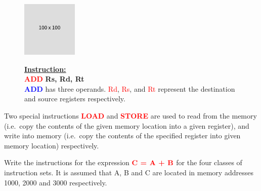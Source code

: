 \documentclass[
  14pt,
  a4paper,
  DIV=11,
  numbers=noendperiod,
  headinclude=true,
  footinclude=true]{scrreprt}
\begin{document}
\begin{figure}[H]

\begin{minipage}{0.40\linewidth}

\includegraphics{index_files/mediabag/FiKGhYhhIWJYiBgWIoaF.png}\end{minipage}%
%
\begin{minipage}{0.60\linewidth}

\begin{tcolorbox}[colback=boxbodycol, colframe=boxbodycol]
\textbf{\underline{Instruction:}}\\
\textcolor{red}{\textbf{ADD}} \textbf{Rs, Rd, Rt}\\
\textcolor{blue}{\textbf{ADD}} has three operands. \textcolor{red}{Rd},
\textcolor{red}{Rs}, and \textcolor{red}{Rt} represent the destination
and source registers respectively.

\end{tcolorbox}

\end{minipage}%

\end{figure}%

\begin{tcolorbox}[colback=boxbodycol, colframe=boxbodycol]
Two special instructions \textcolor{red}{\textbf{LOAD}} and
\textcolor{red}{\textbf{STORE}} are used to read from the memory
(i.e.~copy the contents of the given memory location into a given
register), and write into memory (i.e.~copy the contents of the
specified register into given memory location) respectively.

\end{tcolorbox}

\begin{tcolorbox}[colback=boxbodycol2, colframe=boxheadcol2, title=Example, coltitle=boxtitlecol2, colbacktitle=boxheadcol2]
Write the instructions for the expression
\(\textcolor{red}{\textbf{C = A + B}}\) for the four classes of
instruction sets. It is assumed that A, B and C are located in memory
addresses 1000, 2000 and 3000 respectively.

\end{tcolorbox}
\end{document}
